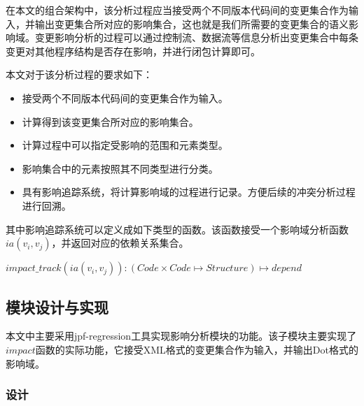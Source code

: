 在本文的组合架构中，该分析过程应当接受两个不同版本代码间的变更集合作为输入，并输出变更集合所对应的影响集合，这也就是我们所需要的变更集合的语义影响域。变更影响分析的过程可以通过控制流、数据流等信息分析出变更集合中每条变更对其他程序结构是否存在影响，并进行闭包计算即可。

本文对于该分析过程的要求如下：
\begin{itemize}
	\item 接受两个不同版本代码间的变更集合作为输入。
	\item 计算得到该变更集合所对应的影响集合。
	\item 计算过程中可以指定受影响的范围和元素类型。
	\item 影响集合中的元素按照其不同类型进行分类。
	\item 具有影响追踪系统，将计算影响域的过程进行记录。方便后续的冲突分析过程进行回溯。
\end{itemize}

其中影响追踪系统可以定义成如下类型的函数。该函数接受一个影响域分析函数$ia(v_i,v_j)$，并返回对应的依赖关系集合。

\begin{definition}
	$impact\_track(ia(v_i,v_j)):(Code \times Code \mapsto {Structure}) \mapsto {depend}$
\end{definition}


%
%

\subsection{模块设计与实现}

本文中主要采用jpf-regression工具实现影响分析模块的功能。该子模块主要实现了$impact$函数的实际功能，它接受XML格式的变更集合作为输入，并输出Dot格式的影响域。

\subsubsection{设计}

